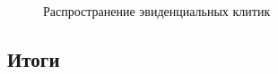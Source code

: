 \begin{figure}[H]
\centering
\caption{Распространение эвиденциальных клитик}
\label{fig:clitictype}
\vspace{0.7cm}
\end{figure}


\subsection{Итоги} \label{sec:itogi2}

